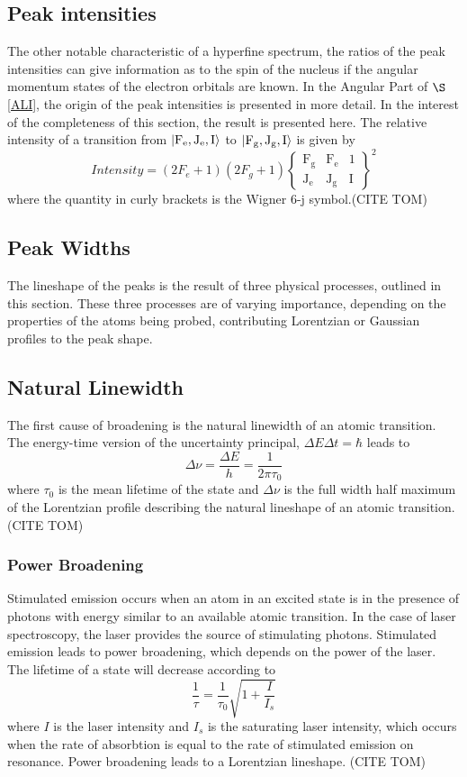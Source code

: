 \documentclass[12pt,a4paper,margin=1in]{report}
\begin{document}
\subsection{Peak intensities} 
The other notable characteristic of a hyperfine spectrum, the ratios of the peak intensities can give information as to the spin of the nucleus if the angular momentum states of the electron orbitals are known. In the Angular Part of $\S$ \ref{ALI}, the origin of the peak intensities is presented in more detail. In the interest of the completeness of this section, the result is presented here. The relative intensity of a transition from $\ket{\mathrm{F_e,J_e,I}}$ to $\ket{\mathrm{F_g,J_g,I}}$ is given by
\begin{equation}
Intensity = (2F_e+1)(2F_g+1)
\left\lbrace
\mathrm{
\begin{matrix}
F_g & F_e & 1\\
J_e & J_g & I 
\end{matrix}
}
\right\rbrace^2
\end{equation}
where the quantity in curly brackets is the Wigner 6-j symbol.(CITE TOM)
\subsection{Peak Widths}
The lineshape of the peaks is the result of three physical processes, outlined in this section. These three processes are of varying importance, depending on the properties of the atoms being probed, contributing Lorentzian or Gaussian profiles to the peak shape. 

\subsection*{Natural Linewidth}
The first cause of broadening is the natural linewidth of an atomic transition. The energy-time version of the uncertainty principal, $\Delta E \Delta t= \hbar$ leads to 
\begin{equation}
\Delta \nu = \frac{\Delta E}{h}=\frac{1}{2 \pi \tau_0}
\end{equation}
where $\tau_0$ is the mean lifetime of the state and $\Delta \nu$ is the full width half maximum of the Lorentzian profile describing the natural lineshape of an atomic transition.(CITE TOM)

\subsubsection*{Power Broadening}
Stimulated emission occurs when an atom in an excited state is in the presence of photons with energy similar to an available atomic transition. In the case of laser spectroscopy, the laser provides the source of stimulating photons. Stimulated emission leads to power broadening, which depends on the power of the laser. The lifetime of a state will decrease according to
\begin{equation}
\frac{1}{\tau}= \frac{1}{\tau_0}\sqrt{1+\frac{I}{I_s}}
\end{equation}
where $I$ is the laser intensity and $I_s$ is the saturating laser intensity, which occurs when the rate of absorbtion is equal to the rate of stimulated emission on resonance. Power broadening leads to a Lorentzian lineshape. (CITE TOM)
\end{document}
